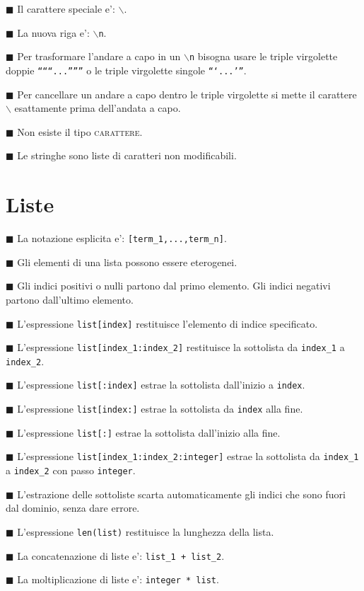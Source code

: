 \documentclass[a4paper,12pt,fleqn,leqno,twoside]{article}
\newcommand{\tw}{\texttt} %
\renewcommand{\sc}{\textsc} %
\newcommand{\bbox}{{\scriptsize $\blacksquare$}} %
\newcommand{\skipline}{\vspace{\baselineskip}} %
\newcommand{\bs}{$\backslash$} %
\newcommand{\bitem}[1]{\bbox \; #1\par \skipline}
\begin{document}
\bitem{Il carattere speciale e': \tw{\bs}.}

\bitem{La nuova riga e': \tw{\bs n}.}

\bitem{Per trasformare l'andare a capo in un \tw{\bs n} bisogna usare le triple virgolette doppie \tw{``````...''''''} o le triple virgolette singole \tw{```...'''}.}

\bitem{Per cancellare un andare a capo dentro le triple virgolette si mette il carattere \tw{\bs} esattamente prima dell'andata a capo.}

\bitem{Non esiste il tipo \sc{carattere}.}

\bitem{Le stringhe sono liste di caratteri non modificabili.}

\section{Liste}

\bitem{La notazione esplicita e': \tw{[term\_1,...,term\_n]}.}

\bitem{Gli elementi di una lista possono essere eterogenei.}

\bitem{Gli indici positivi o nulli partono dal primo elemento. Gli indici negativi partono dall'ultimo elemento.}

\bitem{L'espressione \tw{list[index]} restituisce l'elemento di indice specificato.}

\bitem{L'espressione \tw{list[index\_1:index\_2]} restituisce la sottolista da \tw{index\_1} a \tw{index\_2}.}

\bitem{L'espressione \tw{list[:index]} estrae la sottolista dall'inizio a \tw{index}.}

\bitem{L'espressione \tw{list[index:]} estrae la sottolista da \tw{index} alla fine.}

\bitem{L'espressione \tw{list[:]} estrae la sottolista dall'inizio alla fine.}

\bitem{L'espressione \tw{list[index\_1:index\_2:integer]} estrae la sottolista da \tw{index\_1} a \tw{index\_2} con passo \tw{integer}.}

\bitem{L'estrazione delle sottoliste scarta automaticamente gli indici che sono fuori dal dominio, senza dare errore.}

\bitem{L'espressione \tw{len(list)} restituisce la lunghezza della lista.}

\bitem{La concatenazione di liste e': \tw{list\_1 + list\_2}.}

\bitem{La moltiplicazione di liste e': \tw{integer * list}.}
\end{document}
